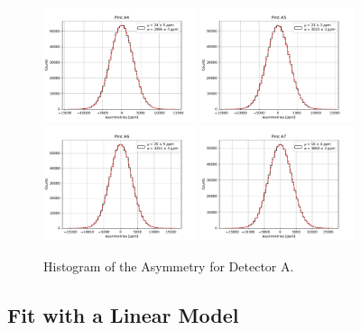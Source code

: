 \begin{figure}[hbtp]
\centering
\includegraphics[width = 0.40\textwidth]{Analysis/Histogram/A4.pdf}
\includegraphics[width = 0.40\textwidth]{Analysis/Histogram/A5.pdf}\\
\includegraphics[width = 0.40\textwidth]{Analysis/Histogram/A6.pdf}
\includegraphics[width = 0.40\textwidth]{Analysis/Histogram/A7.pdf}
\caption{Histogram of the Asymmetry for Detector A.}
\end{figure}

\newpage
\newpage
\subsection{Fit with a Linear Model}

